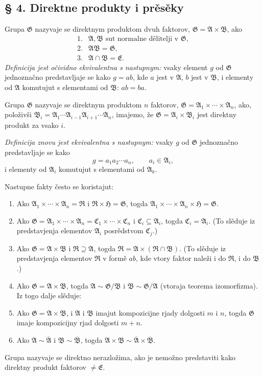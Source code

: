 \documentclass[11pt]{article}
\providecommand{\mG}{\mathfrak{G}}
\providecommand{\mA}{\mathfrak{A}}
\providecommand{\mB}{\mathfrak{B}}
\providecommand{\mE}{\mathfrak{E}}
\providecommand{\mH}{\mathfrak{H}}
\providecommand{\mC}{\mathfrak{C}}
\providecommand{\mR}{\mathfrak{R}}
\begin{document}
\setcounter{footnote}{10}

\subsection*{§ 4. Direktne produkty i prěsěky}

Grupa $\mG$ nazyvaje se direktnym produktom dvuh faktorov, $\mG=\mA\times\mB$, ako
\[
\begin{array}{ll}
1.& \mA,\mB\text{ sut normalne dělitelji v }\mG,\\
2.& \mA\mB=\mG,\\
3.& \mA\cap\mB=\mE.
\end{array}
\]
\emph{Definicija jest očividno ekvivalentna s nastupnym:} vsaky element $g$ od $\mG$ jednoznačno predstavljaje se kako $g=ab$, kde $a$ jest v $\mA$, $b$ jest v $\mB$, i elementy od $\mA$ komutujut s elementami od $\mB$: $ab=ba$.

Grupa $\mG$ nazyvaje se direktnym produktom $n$ faktorov, $\mG=\mA_1\times\cdots\times\mA_n$, ako, položivši $\mB_i=\mA_1\cdots\mA_{i-1}\mA_{i+1}\cdots\mA_n$, imajemo, že $\mG=\mA_i\times\mB_i$ jest direktny produkt za vsako $i$.

\emph{Definicija znovu jest ekvivalentna s nastupnym:} vsaky $g$ od $\mG$ jednoznačno predstavljaje se kako
\[
        g=a_1a_2\cdots a_n,\qquad a_i\in\mA_i,
\]
i elementy od $\mA_i$ komutujut s elementami od $\mA_k$.

Nastupne fakty često se koristajut:
\begin{enumerate}
\item Ako $\mA_1\times\cdots\times\mA_n=\mR$ i $\mR\times\mH=\mG$, togda $\mA_1\times\cdots\times\mA_n\times\mH=\mG$.
\item Ako $\mG=\mA_1\times\cdots\times\mA_n=\mC_1\times\cdots\times\mC_n$ i $\mC_i\subseteq\mA_i$, togda $\mC_i=\mA_i$. (To slěduje iz predstavjenja elementov $\mA_i$ posrědstvom $\mC_j$.)
\item Ako $\mG=\mA\times\mB$ i $\mR\supseteq\mA$, togda $\mR=\mA\times(\mR\cap\mB)$. (To slěduje iz predstavjenja elementov $\mR$ v formě $ab$, kde vtory faktor naleži i do $\mR$, i do $\mB$.)
\item Ako $\mG=\mA\times\mB$, togda $\mA\sim\mG/\mB$ i $\mB\sim\mG/\mA$ (vtoraja teorema izomorfizma). Iz togo dalje slěduje:
\item Ako $\mG=\mA\times\mB$, i $\mA$ i $\mB$ imajut kompozicijne rjady dolgosti $m$ i $n$, togda $\mG$ imaje kompozicijny rjad dolgosti $m+n$.
\item Ako $\mA\sim\overline{\mA}$ i $\mB\sim\overline{\mB}$, togda $\mA\times\mB\sim\overline{\mA}\times\overline{\mB}$.
\end{enumerate}
Grupa nazyvaje se direktno nerazložima, ako je nemožno predstaviti kako direktny produkt faktorov $\ne\mE$.
\end{document}
